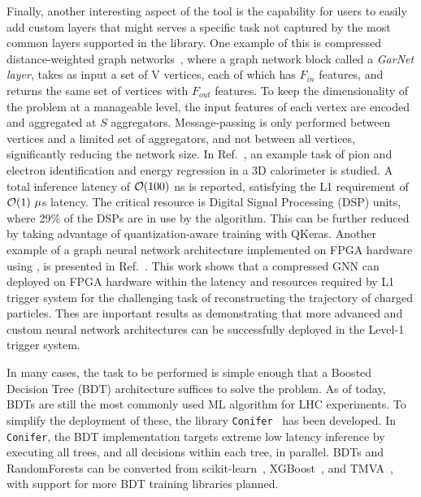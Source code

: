 Finally, another interesting aspect of the \hlsfml tool is the capability for users to easily add custom layers that might serves a specific task not captured by the most common layers supported in the library. One example of this is compressed distance-weighted graph networks~\cite{garnet}, where a graph network block called a {\em GarNet layer}, takes as input a set of V vertices, each of which has $F_{in}$ features, and returns the same set of vertices with $F_{out}$ features. To keep the dimensionality of the problem at a manageable level, the input features of each vertex are encoded and aggregated at $S$ aggregators. Message-passing is only performed between vertices and a limited set of aggregators, and not between all vertices, significantly reducing the network size. In Ref.~\cite{garnet}, an example task of pion and electron identification and energy regression in a 3D calorimeter is studied. A total inference latency of ${\cal O}(100)~$ns is reported, satisfying the L1 requirement of ${\cal O}(1)~\mu$s latency. The critical resource is Digital Signal Processing (DSP) units, where 29\% of the DSPs are in use by the algorithm. This can be further reduced by taking advantage of quantization-aware training with QKeras. Another example of a graph neural network architecture implemented on FPGA hardware using \hlsfml, is presented in Ref.~\cite{heintz2020accelerated}. This work shows that a compressed GNN can deployed on FPGA hardware within the latency and resources required by L1 trigger system for the challenging task of reconstructing the trajectory of charged particles.
Thes are important results as demonstrating that more advanced and custom neural network architectures can be successfully deployed in the Level-1 trigger system. 

In many cases, the task to be performed is simple enough that a Boosted Decision Tree (BDT) architecture suffices to solve the problem. As of today, BDTs are still the most commonly used ML algorithm for LHC experiments. To simplify the deployment of these, the library {\tt Conifer}~\cite{Summers:2020xiy} has been developed. In {\tt Conifer}, the BDT implementation targets extreme low latency inference by executing all trees, and all decisions within each tree, in parallel. BDTs and RandomForests can be converted from scikit-learn~\cite{scikit-learn}, XGBoost~\cite{XGBoost}, and TMVA~\cite{TMVA}, with support for more BDT training libraries planned.

